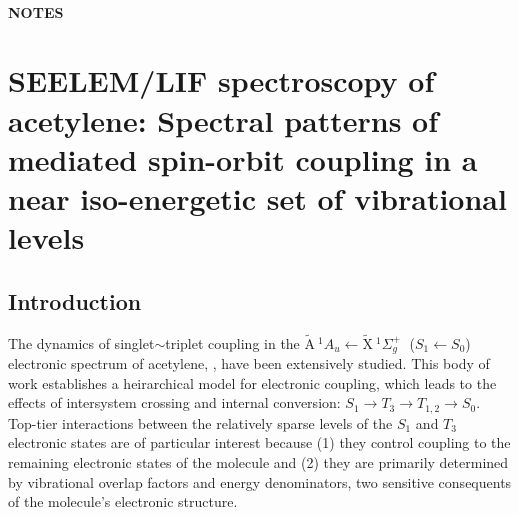 \documentclass[12pt]{mitthesis}
\newcommand{\bigspace}{$
  \;
  $}
\newcommand{\AtoX}{$
  \tilde{\text{A}} \: ^1\!A_u 
  \leftarrow 
  \tilde{\text{X}} \: ^1\Sigma_g^+
  $}
\newcommand{\StoS}{$
  S_1 \leftarrow S_0
  $}
\begin{document}
\tableofcontents
\clearpage

\subsubsection*{NOTES}

\clearpage

\setcounter{chapter}{3}
\chapter{SEELEM/LIF spectroscopy of acetylene: 
Spectral patterns of mediated spin-orbit coupling
in a near iso-energetic set of vibrational levels}

\section{Introduction}

The dynamics of singlet$\sim$triplet coupling in the \AtoX \bigspace
(\StoS) electronic spectrum of acetylene, , have been
extensively studied.  This body of work establishes a heirarchical
model for electronic coupling, which leads to the effects of
intersystem crossing and internal conversion: $S_1 \rightarrow T_3
\rightarrow T_{1,2} \rightarrow S_0$.  Top-tier interactions between
the relatively sparse levels of the $S_1$ and $T_3$ electronic states
are of particular interest because (1) they control coupling to the
remaining electronic states of the molecule and (2) they are primarily
determined by vibrational overlap factors and energy denominators, two
sensitive consequents of the molecule's electronic structure.

\end{document}
